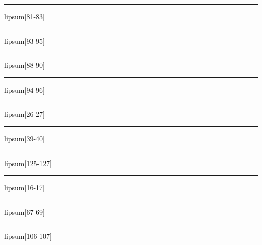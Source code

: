 \documentclass[11pt,a4paper]{article}
\begin{document}
\begin{simplewrap}
  \textcolor{cyan!39}{\rule{5.9cm}{7.6cm}}
\end{simplewrap}
lipsum[81-83]

\begin{simplewrap}
  \textcolor{red!53}{\rule{3.6cm}{6.6cm}}
\end{simplewrap}
lipsum[93-95]

\begin{simplewrap}
  \textcolor{teal!21}{\rule{4.6cm}{3.9cm}}
\end{simplewrap}
lipsum[88-90]

\begin{simplewrap}
  \textcolor{red!37}{\rule{3.6cm}{7.6cm}}
\end{simplewrap}
lipsum[94-96]

\begin{simplewrap}
  \textcolor{teal!38}{\rule{3.5cm}{3.0cm}}
\end{simplewrap}
lipsum[26-27]

\begin{simplewrap}
  \textcolor{magenta!45}{\rule{4.3cm}{5.0cm}}
\end{simplewrap}
lipsum[39-40]

\begin{simplewrap}
  \textcolor{red!21}{\rule{4.3cm}{3.1cm}}
\end{simplewrap}
lipsum[125-127]

\begin{simplewrap}
  \textcolor{magenta!46}{\rule{3.1cm}{2.8cm}}
\end{simplewrap}
lipsum[16-17]

\begin{simplewrap}
  \textcolor{teal!40}{\rule{5.5cm}{2.8cm}}
\end{simplewrap}
lipsum[67-69]

\begin{simplewrap}
  \textcolor{magenta!45}{\rule{5.8cm}{4.1cm}}
\end{simplewrap}
lipsum[106-107]
\end{document}
